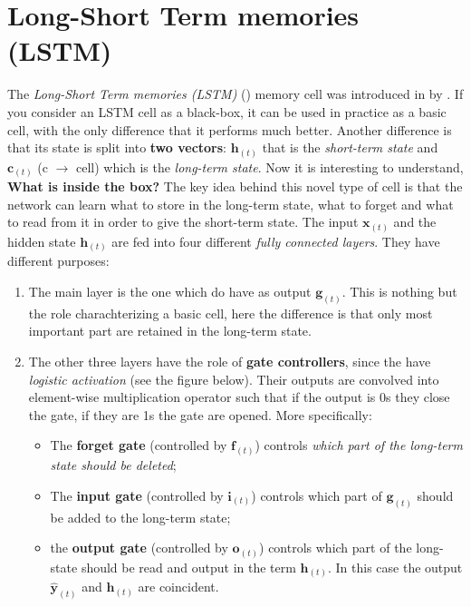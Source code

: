 \section{Long-Short Term memories (LSTM)}
The \textit{Long-Short Term memories (LSTM)} (\cite{hochreiter1997long}) memory cell was introduced in  by . 
If you consider an LSTM cell as a black-box, it can be used in practice as a basic cell, with the only difference that it performs much better. Another difference is that its state is split into \textbf{two vectors}: $\mathbf{h}_{(t)}$ that is the \textit{short-term state} and $\mathbf{c}_{(t)}$ (c $\to$ cell) which is the \textit{long-term state}. Now it is interesting to understand, \textbf{What is inside the box?}
The key idea behind this novel type of cell is that the network can learn what to store in the long-term state, what to forget and what to read from it in order to give the short-term state. The input $\mathbf{x}_{(t)}$ and the hidden state $\mathbf{h}_{(t)}$ are fed into four different \textit{fully connected layers}. They have different purposes:
\begin{enumerate}
    \item[\ding{202}] The main layer is the one which do have as output $\mathbf{g}_(t)$. This is nothing but the role charachterizing a basic cell, here the difference is that only most important part are retained in the long-term state.
    \item[\ding{203}] The other three layers have the role of \textbf{gate controllers}, since the have \textit{logistic activation} (see the figure below). Their outputs are convolved into element-wise multiplication operator such that if the output is 0s they close the gate, if they are 1s the gate are opened. More specifically: 
    \begin{itemize}
        \item The \textbf{forget gate} (controlled by $\mathbf{f}_{(t)}$) controls \textit{which part of the long-term state should be deleted}; 
        \item The \textbf{input gate} (controlled by $\mathbf{i}_{(t)}$) controls which part of $\mathbf{g}_{(t)}$ should be added to the long-term state; 
        \item the \textbf{output gate} (controlled by $\mathbf{o}_{(t)}$) controls which part of the long-state should be read and output in the term $\mathbf{h}_{(t)}$. In this case the output $\mathbf{\hat{y}}_{(t)}$ and $\mathbf{h}_{(t)}$ are coincident.
    \end{itemize}
\end{enumerate}
